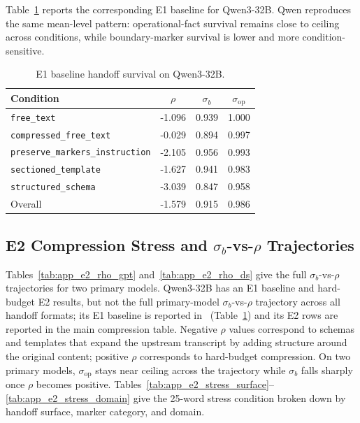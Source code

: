 Table~\ref{tab:e1_qwen_app} reports the corresponding E1 baseline for Qwen3-32B. Qwen reproduces the same mean-level pattern: operational-fact survival remains close to ceiling across conditions, while boundary-marker survival is lower and more condition-sensitive.

\begin{table}[ht]
\centering
\small
\caption{E1 baseline handoff survival on Qwen3-32B.}
\label{tab:e1_qwen_app}
\begin{tabular}{lccc}
\toprule
Condition & $\rho$ & $\sigma_b$ & $\sigma_{\mathrm{op}}$ \\
\midrule
\texttt{free\_text} & -1.096 & 0.939 & 1.000 \\
\texttt{compressed\_free\_text} & -0.029 & 0.894 & 0.997 \\
\texttt{preserve\_markers\_instruction} & -2.105 & 0.956 & 0.993 \\
\texttt{sectioned\_template} & -1.627 & 0.941 & 0.983 \\
\texttt{structured\_schema} & -3.039 & 0.847 & 0.958 \\
\midrule
Overall & -1.579 & 0.915 & 0.986 \\
\bottomrule
\end{tabular}
\end{table}

\subsection{E2 Compression Stress and $\sigma_b$-vs-$\rho$ Trajectories}
\label{app:e2}
Tables~\ref{tab:app_e2_rho_gpt} and~\ref{tab:app_e2_rho_ds} give the full $\sigma_b$-vs-$\rho$ trajectories for two primary models.
Qwen3-32B has an E1 baseline and hard-budget E2 results, but not the full primary-model $\sigma_b$-vs-$\rho$ trajectory across all handoff formats; its E1 baseline is reported in~ (Table~\ref{tab:e1_qwen_app}) and its E2 rows are reported in the main compression table.
Negative $\rho$ values correspond to schemas and templates that expand the upstream transcript by adding structure around the original content; positive $\rho$ corresponds to hard-budget compression. On two primary models, $\sigma_{\mathrm{op}}$ stays near ceiling across the trajectory while $\sigma_b$ falls sharply once $\rho$ becomes positive. Tables~\ref{tab:app_e2_stress_surface}--\ref{tab:app_e2_stress_domain} give the 25-word stress condition broken down by handoff surface, marker category, and domain.

